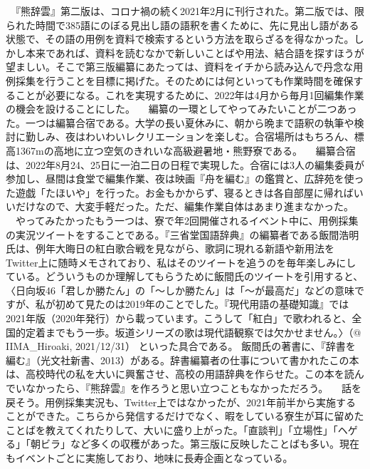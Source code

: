 　『熊辞雲』第二版は、コロナ禍の続く2021年2月に刊行された。第二版では、限られた時間で385語にのぼる見出し語の語釈を書くために、先に見出し語がある状態で、その語の用例を資料で検索するという方法を取らざるを得なかった。しかし本来であれば、資料を読むなかで新しいことばや用法、結合語を探すほうが望ましい。そこで第三版編纂にあたっては、資料をイチから読み込んで丹念な用例採集を行うことを目標に掲げた。そのためには何といっても作業時間を確保することが必要になる。これを実現するために、2022年は4月から毎月1回編集作業の機会を設けることにした。
　編纂の一環としてやってみたいことが二つあった。一つは編纂合宿である。大学の長い夏休みに、朝から晩まで語釈の執筆や検討に勤しみ、夜はわいわいレクリエーションを楽しむ。合宿場所はもちろん、標高1367mの高地に立つ空気のきれいな高級避暑地・熊野寮である。
　編纂合宿は、2022年8月24、25日に一泊二日の日程で実現した。合宿には3人の編集委員が参加し、昼間は食堂で編集作業、夜は映画『舟を編む』の鑑賞と、広辞苑を使った遊戯「たほいや」を行った。お金もかからず、寝るときは各自部屋に帰ればいいだけなので、大変手軽だった。ただ、編集作業自体はあまり進まなかった。
　やってみたかったもう一つは、寮で年2回開催されるイベント中に、用例採集の実況ツイートをすることである。『三省堂国語辞典』の編纂者である飯間浩明氏は、例年大晦日の紅白歌合戦を見ながら、歌詞に現れる新語や新用法をTwitter上に随時メモされており、私はそのツイートを追うのを毎年楽しみにしている。どういうものか理解してもらうために飯間氏のツイートを引用すると、
〈日向坂46「君しか勝たん」の「～しか勝たん」は「～が最高だ」などの意味ですが、私が初めて見たのは2019年のことでした。『現代用語の基礎知識』では2021年版（2020年発行）から載っています。こうして「紅白」で歌われると、全国的定着までもう一歩。坂道シリーズの歌は現代語観察では欠かせません。〉（@ IIMA\_Hiroaki, 2021/12/31）
といった具合である。
飯間氏の著書に、『辞書を編む』（光文社新書、2013）がある。辞書編纂者の仕事について書かれたこの本は、高校時代の私を大いに興奮させ、高校の用語辞典を作らせた。この本を読んでいなかったら、『熊辞雲』を作ろうと思い立つこともなかっただろう。
　話を戻そう。用例採集実況も、Twitter上ではなかったが、2021年前半から実施することができた。こちらから発信するだけでなく、暇をしている寮生が耳に留めたことばを教えてくれたりして、大いに盛り上がった。「直談判」「立場性」「ヘゲる」「朝ビラ」など多くの収穫があった。第三版に反映したことばも多い。現在もイベントごとに実施しており、地味に長寿企画となっている。

